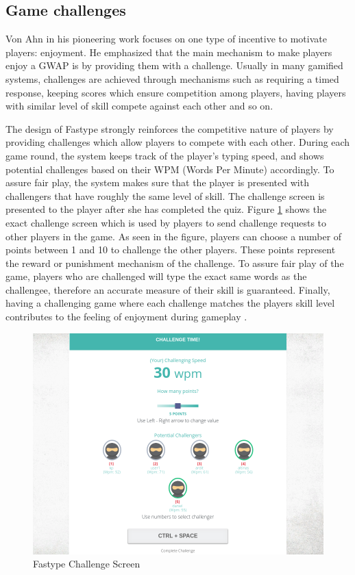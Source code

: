 \subsection{Game challenges}
Von Ahn in his pioneering work \cite{vonahn} focuses on one type of incentive to motivate players: enjoyment. He emphasized that the main mechanism to make players enjoy a GWAP is by providing them with a challenge. Usually in many gamified systems, challenges are achieved through mechanisms such as requiring a timed response, keeping scores which ensure competition among players, having players with similar level of skill compete against each other and so on. \cite{44} 

The design of Fastype strongly reinforces the competitive nature of players by providing challenges which allow players to compete with each other. During each game round, the system keeps track of the player's typing speed, and shows potential challenges based on their WPM (Words Per Minute) accordingly. To assure fair play, the system makes sure that the player is presented with challengers that have roughly the same level of skill. The challenge screen is presented to the player after she has completed the quiz. Figure \ref{fig:game-challenge-screen} shows the exact challenge screen which is used by players to send challenge requests to other players in the game. As seen in the figure, players can choose a number of points between 1 and 10 to challenge the other players. These points represent the reward or punishment mechanism of the challenge. To assure fair play of the game, players who are challenged will type the exact same words as the challengee, therefore an accurate measure of their skill is guaranteed. Finally, having a challenging game where each challenge matches the players skill level contributes to the feeling of enjoyment during gameplay \cite{43}.

\begin{figure}[]
    \centering
    \includegraphics[width=.8\linewidth]{figures/experiment2/challenge-time.png}
    \caption{Fastype Challenge Screen}
    \label{fig:game-challenge-screen}
\end{figure}

